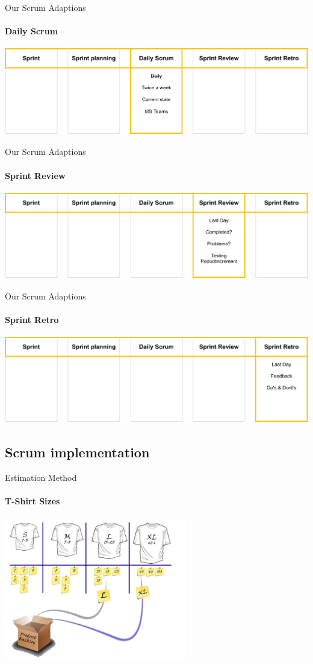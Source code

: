 \documentclass[
    ngerman,%
    authorontitle=true,
]{bfhbeamer}
\begin{document}
    \begin{frame}{Our Scrum Adaptions}
        \framesubtitle{Daily Scrum}
        \includegraphics[width=1\textwidth]{figures/scrum_adaptions-Daily_Scrum}
    \end{frame}

    \begin{frame}{Our Scrum Adaptions}
        \framesubtitle{Sprint Review}
        \includegraphics[width=1\textwidth]{figures/scrum_adaptions-Sprint_Review}
    \end{frame}

    \begin{frame}{Our Scrum Adaptions}
        \framesubtitle{Sprint Retro}
        \includegraphics[width=1\textwidth]{figures/scrum_adaptions-Sprint_Retro}
    \end{frame}

    \subsection{Scrum implementation}
    \begin{frame}{Estimation Method}
        \framesubtitle{T-Shirt Sizes}
        \begin{center}
            \includegraphics[width=0.6\textwidth]{pictures/tshirt_sizes}
        \end{center}
    \end{frame}
\end{document}
